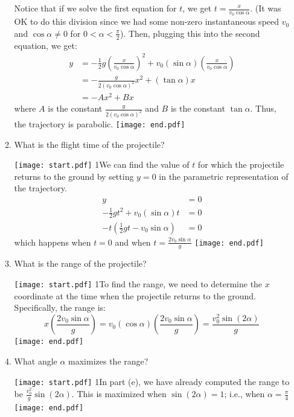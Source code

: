 \documentclass[12pt]{article}
\begin{document}
\begin{enumerate}
\begin{enumerate}
{{{Notice that if we solve the first equation for $t$, we get $t=\frac{x}{v_0\cos{\alpha}}$.  (It was OK to do this division since we had some non-zero instantaneous speed $v_0$ and $\cos{\alpha}\neq 0$ for $0 < \alpha <\frac{\pi}{2}$).  Then, plugging this into the second equation, we get:
\begin{align*}
y&=-\frac{1}{2}g\left(\frac{x}{v_0\cos{\alpha}} \right)^2+v_0(\sin\alpha)\left(\frac{x}{v_0\cos{\alpha}}\right)\\
&=-\frac{g}{2(v_0\cos\alpha)^2}x^2+(\tan{\alpha})x\\
&=-Ax^2+Bx
\end{align*}
where $A$ is the constant $\frac{g}{2(v_0\cos\alpha)^2}$ and $B$ is the constant $\tan\alpha$.  Thus, the trajectory is parabolic.
}}}
\texttt{[image: end.pdf]}


\item What is the flight time of the projectile?

\texttt{[image: start.pdf]}
{{{1\linewidth}{We can find the value of $t$ for which the projectile returns to the ground by setting $y=0$ in the parametric representation of the trajectory.
\begin{align*}
y&=0\\
-\frac{1}{2}gt^2+v_0(\sin\alpha)t &=0\\
-t\left(\frac{1}{2}gt-v_0\sin\alpha\right)&=0
\end{align*}
which happens when $t=0$ and when $t=\frac{2v_0\sin\alpha}{g}$
}}}
\texttt{[image: end.pdf]}


\item What is the range of the projectile?

\texttt{[image: start.pdf]}
{{{1\linewidth}{To find the range, we need to determine the $x$ coordinate at the time when the projectile returns to the ground.  Specifically, the range is: $$x\left(\frac{2v_0\sin\alpha}{g}\right)=v_0(\cos\alpha)\left(\frac{2v_0\sin\alpha}{g}\right)=\frac{v_0^2\sin{(2\alpha)}}{g}$$
}}}
\texttt{[image: end.pdf]}


\item What angle $\alpha$ maximizes the range?

\texttt{[image: start.pdf]}
{{{1\linewidth}{In part (e), we have already computed the range to be $\frac{v_0^2}{g}\sin{(2\alpha)}$.  This is maximized when $\sin(2\alpha)=1$; i.e., when $\alpha =\frac{\pi}{4}$
}}}
\texttt{[image: end.pdf]}


\end{enumerate}


\end{enumerate}
\end{document}
